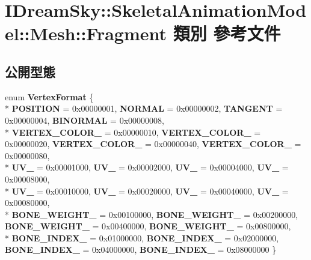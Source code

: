 \hypertarget{class_i_dream_sky_1_1_skeletal_animation_model_1_1_mesh_1_1_fragment}{}\section{I\+Dream\+Sky\+:\+:Skeletal\+Animation\+Model\+:\+:Mesh\+:\+:Fragment 類別 參考文件}
\label{class_i_dream_sky_1_1_skeletal_animation_model_1_1_mesh_1_1_fragment}
\subsection*{公開型態}
\begin{DoxyCompactItemize}
\item 
enum {\bfseries Vertex\+Format} \{ \\*
{\bfseries P\+O\+S\+I\+T\+I\+ON} = 0x00000001, 
{\bfseries N\+O\+R\+M\+AL} = 0x00000002, 
{\bfseries T\+A\+N\+G\+E\+NT} = 0x00000004, 
{\bfseries B\+I\+N\+O\+R\+M\+AL} = 0x00000008, 
\\*
{\bfseries V\+E\+R\+T\+E\+X\+\_\+\+C\+O\+L\+O\+R\+\_} = 0x00000010, 
{\bfseries V\+E\+R\+T\+E\+X\+\_\+\+C\+O\+L\+O\+R\+\_} = 0x00000020, 
{\bfseries V\+E\+R\+T\+E\+X\+\_\+\+C\+O\+L\+O\+R\+\_} = 0x00000040, 
{\bfseries V\+E\+R\+T\+E\+X\+\_\+\+C\+O\+L\+O\+R\+\_} = 0x00000080, 
\\*
{\bfseries U\+V\+\_} = 0x00001000, 
{\bfseries U\+V\+\_} = 0x00002000, 
{\bfseries U\+V\+\_} = 0x00004000, 
{\bfseries U\+V\+\_} = 0x00008000, 
\\*
{\bfseries U\+V\+\_} = 0x00010000, 
{\bfseries U\+V\+\_} = 0x00020000, 
{\bfseries U\+V\+\_} = 0x00040000, 
{\bfseries U\+V\+\_} = 0x00080000, 
\\*
{\bfseries B\+O\+N\+E\+\_\+\+W\+E\+I\+G\+H\+T\+\_} = 0x00100000, 
{\bfseries B\+O\+N\+E\+\_\+\+W\+E\+I\+G\+H\+T\+\_} = 0x00200000, 
{\bfseries B\+O\+N\+E\+\_\+\+W\+E\+I\+G\+H\+T\+\_} = 0x00400000, 
{\bfseries B\+O\+N\+E\+\_\+\+W\+E\+I\+G\+H\+T\+\_} = 0x00800000, 
\\*
{\bfseries B\+O\+N\+E\+\_\+\+I\+N\+D\+E\+X\+\_} = 0x01000000, 
{\bfseries B\+O\+N\+E\+\_\+\+I\+N\+D\+E\+X\+\_} = 0x02000000, 
{\bfseries B\+O\+N\+E\+\_\+\+I\+N\+D\+E\+X\+\_} = 0x04000000, 
{\bfseries B\+O\+N\+E\+\_\+\+I\+N\+D\+E\+X\+\_} = 0x08000000
 \}\hypertarget{class_i_dream_sky_1_1_skeletal_animation_model_1_1_mesh_1_1_fragment_a2f596e38a86925284742a74a24d4fc36}{}\label{class_i_dream_sky_1_1_skeletal_animation_model_1_1_mesh_1_1_fragment_a2f596e38a86925284742a74a24d4fc36}

\end{DoxyCompactItemize}
